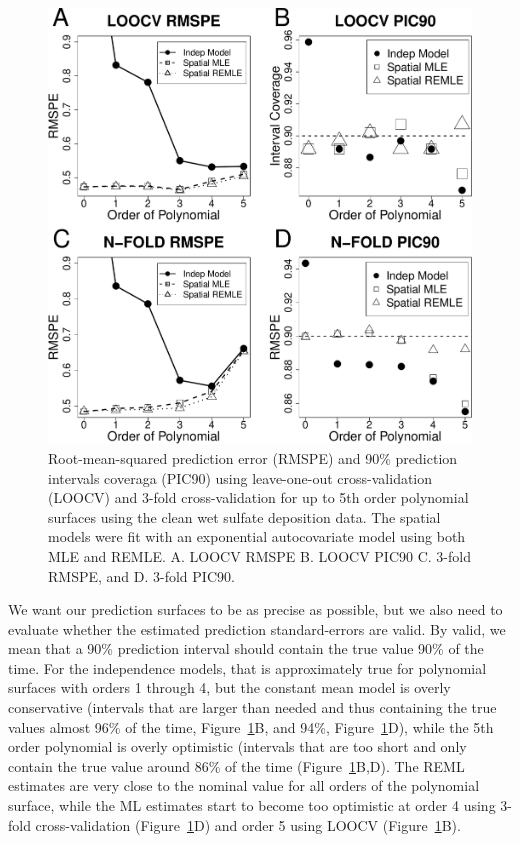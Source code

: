 \documentclass[12pt, titlepage]{article}
\begin{document}
\begin{figure}[H]
  \begin{center}
	    \includegraphics[width=.8\linewidth]{SO4_crossval}
  \end{center}
  \caption{Root-mean-squared prediction error (RMSPE) and 90\% prediction intervals coveraga (PIC90) using leave-one-out cross-validation (LOOCV) and 3-fold cross-validation for up to 5th order polynomial surfaces using the clean wet sulfate deposition data.  The spatial models were fit with an exponential autocovariate model using both MLE and REMLE. A. LOOCV RMSPE B. LOOCV PIC90 C. 3-fold RMSPE, and D. 3-fold PIC90. \label{Fig:SO4_crossval}}
\end{figure}

We want our prediction surfaces to be as precise as possible, but we also need to evaluate whether the estimated prediction standard-errors are valid.  By valid, we mean that a 90\% prediction interval should contain the true value 90\% of the time. For the independence models, that is approximately true for polynomial surfaces with orders 1 through 4, but the constant mean model is overly conservative (intervals that are larger than needed and thus containing the true values almost 96\% of the time, Figure~\ref{Fig:SO4_crossval}B, and 94\%, Figure~\ref{Fig:SO4_crossval}D), while the 5th order polynomial is overly optimistic (intervals that are too short and only contain the true value around 86\% of the time (Figure~\ref{Fig:SO4_crossval}B,D). The REML estimates are very close to the nominal value for all orders of the polynomial surface, while the ML estimates start to become too optimistic at order 4 using 3-fold cross-validation (Figure~\ref{Fig:SO4_crossval}D) and order 5 using LOOCV (Figure~\ref{Fig:SO4_crossval}B).
\end{document}
